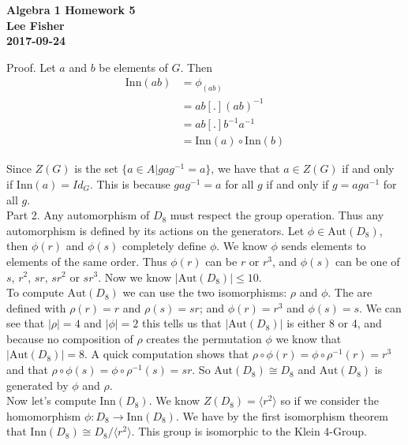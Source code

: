 \documentclass[12pt]{report}
\begin{document}
\textbf{Algebra 1 Homework 5}\\
\indent \textbf{Lee Fisher}\\
\indent \textbf{2017-09-24}

\vspace{0.3cm}

 Proof. Let $a$ and $b$ be elements of $G$. Then
\begin{align*}
   \textrm{Inn}(ab) &= \phi_(ab)\\
                    &= ab [.] (ab)^{-1}\\
                    &= ab [.] b^{-1}a^{-1}\\
                    &= \textrm{Inn}(a) \circ \textrm{Inn}(b)
\end{align*}

Since $Z(G)$ is the set $\{ a \in A | gag^{-1} = a\}$, we have that $a \in Z(G)$
if and only if $\textrm{Inn}(a) = Id_G$. This is because $gag^{-1} = a$ for all
$g$ if and only if $g = aga^{-1}$ for all $g$.\\

Part 2. Any automorphism of $D_8$ must respect the group operation. Thus any
automorphism is defined by its actions on the generators. Let $\phi \in
\textrm{Aut}(D_8)$, then $\phi(r)$ and $\phi(s)$ completely define $\phi$.
We know $\phi$ sends elements to elements of the same order. Thus $\phi(r)$ can
be $r$ or $r^3$, and $\phi(s)$ can be one of $s$, $r^2$, $sr$, $sr^2$ or $sr^3$.
Now we know $|\textrm{Aut}(D_8)| \leq 10$.\\

To compute $\textrm{Aut}(D_8)$ we can use the two isomorphisms: $\rho$ and
$\phi$. The are defined with $\rho(r) = r$ and $\rho(s) = sr$; and $\phi(r) =
r^3$ and $\phi(s) = s$. We can see that $|\rho| = 4$ and $|\phi|=2$ this tells
us that $|\textrm{Aut}(D_8)|$ is either 8 or 4, and because no composition of
$\rho$ creates the permutation $\phi$ we know that $|\textrm{Aut}(D_8)| = 8$.
A quick computation shows that $\rho\circ\phi(r)=\phi\circ\rho^{-1}(r)=r^3$
and that $\rho\circ\phi(s)=\phi\circ\rho^{-1}(s)=sr$. So $\textrm{Aut}(D_8)
\cong D_8$ and $\textrm{Aut}(D_8)$ is generated by $\phi$ and $\rho$.\\

Now let's compute $\textrm{Inn}(D_8)$. We know $Z(D_8) = \langle r^2 \rangle$ so
if we consider the homomorphism $\phi: D_8 \to \textrm{Inn}(D_8)$. We have by
the first isomorphism theorem that $\textrm{Inn}(D_8) \cong D_8 / \langle r^2
\rangle$. This group is isomorphic to the Klein 4-Group.\\
\end{document}
